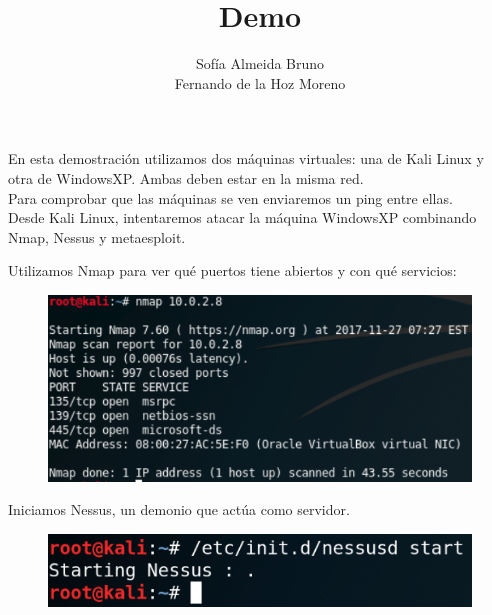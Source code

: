 \documentclass{beamer}
\title{Demo}
\subtitle{}
\author{Sofía Almeida Bruno\\\qquad\quad Fernando de la Hoz Moreno}
\date{}
\begin{document}
\begin{frame}
  \maketitle
\end{frame}

\begin{frame}
	En esta demostración utilizamos dos máquinas virtuales: una de Kali Linux y otra de WindowsXP. Ambas deben estar en la misma red.\\
	
	Para comprobar que las máquinas se ven enviaremos un ping entre ellas.\\
	
	Desde Kali Linux, intentaremos atacar la máquina WindowsXP combinando Nmap, Nessus y metaesploit.
\end{frame}

\begin{frame}

Utilizamos Nmap para ver qué puertos tiene abiertos y con qué servicios:

\begin{figure}[h]
\centering
		\includegraphics[scale=0.5]{./img/Demo/Nmap1}
\end{figure}

\end{frame}

\begin{frame}

Iniciamos Nessus, un demonio que actúa como servidor.

\begin{figure}[h]
\centering
		\includegraphics[scale=0.5]{./img/Demo/Nessus1}
\end{figure}
\end{frame}
\end{document}
